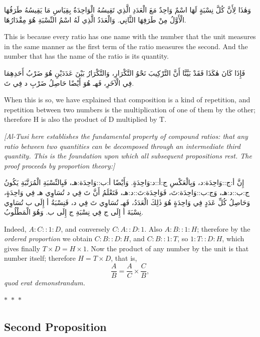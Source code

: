 \documentclass[11pt,a4paper]{article}
\theoremstyle{plain}
\theoremstyle{definition}
\theoremstyle{remark}
\newcommand{\ar}[1]{{\arabicfont\beginR #1\endR}}
\newcommand{\bilingualpair}[2]{%
  \par\noindent
  \begin{minipage}[t]{0.48\textwidth}
  #1
  \end{minipage}%
  \hfill
  \begin{minipage}[t]{0.48\textwidth}
  \vspace*{0pt}#2
  \end{minipage}\par\vspace{0.3cm}%
}
\newcommand{\ornament}{\begin{center}\textcolor{goldaccent}{$\ast$~$\ast$~$\ast$}\end{center}}
\begin{document}
\bilingualpair{\ar{وَهٰذَا لِأَنَّ كُلَّ نِسْبَةٍ لَهَا اسْمٌ وَاحِدٌ مَعَ الْعَدَدِ الَّذِي تَقِيسُهُ الْوَاحِدَةُ بِقِيَاسِ مَا يَقِيسُهُ طَرَفُهَا الْأَوَّلُ مِنْ طَرَفِهَا الثَّانِي. وَالْعَدَدُ الَّذِي لَهُ اسْمُ النِّسْبَةِ هُوَ مِقْدَارُهَا.}}{This is because every ratio has one name with the number that the unit measures in the same manner as the first term of the ratio measures the second. And the number that has the name of the ratio is its quantity.}

\vspace{0.3cm}

\bilingualpair{\ar{فَإِذَا كَانَ هٰكَذَا فَقَدْ بَيَّنَّا أَنَّ التَّرْكِيبَ نَحْوُ التَّكْرَارِ، وَالتَّكْرَارُ بَيْنَ عَدَدَيْنِ هُوَ ضَرْبُ أَحَدِهِمَا فِي الْآخَرِ، فَهـ هُوَ أَيْضًا حَاصِلُ ضَرْبِ د فِي تَ.}}{When this is so, we have explained that composition is a kind of repetition, and repetition between two numbers is the multiplication of one of them by the other; therefore H is also the product of D multiplied by T.}

\vspace{0.3cm}

\noindent\textit{[Al-Tusi here establishes the fundamental property of compound ratios: that any ratio between two quantities can be decomposed through an intermediate third quantity. This is the foundation upon which all subsequent propositions rest. The proof proceeds by proportion theory:]}

\bilingualpair{\ar{إِنَّ أ:ج::وَاحِدَة:د، وَبِالْعَكْسِ ج:أ::د:وَاحِدَةٍ. وَأَيْضًا أ:ب::وَاحِدَة:هـ، فَبِالنِّسْبَةِ الْمُرَتَّبَةِ يَكُونُ ج:ب::د:هـ، وَج:ب::وَاحِدَة:تَ، فَوَاحِدَة:تَ::د:هـ، فَتَعْلَمُ أَنَّ تَ فِي د تُسَاوِي هـ فِي وَاحِدَةٍ، وَحَاصِلُ كُلِّ عَدَدٍ فِي وَاحِدَةٍ هُوَ ذٰلِكَ الْعَدَدُ، فَهـ تُسَاوِي تَ فِي د، فَنِسْبَةُ أ إِلَى ب تُسَاوِي نِسْبَةَ أ إِلَى ج فِي نِسْبَةِ ج إِلَى ب. وَهُوَ الْمَطْلُوبُ.}}{Indeed, $A:C::1:D$, and conversely $C:A::D:1$. Also $A:B::1:H$; therefore by the \textit{ordered proportion} we obtain $C:B::D:H$, and $C:B::1:T$, so $1:T::D:H$, which gives finally $T \times D = H \times 1$. Now the product of any number by the unit is that number itself; therefore $H = T \times D$, that is,
\[
\frac{A}{B} = \frac{A}{C} \times \frac{C}{B},
\]
\textit{quod erat demonstrandum.}}

\ornament

\subsection{Second Proposition}
\label{prop:2}
\end{document}
